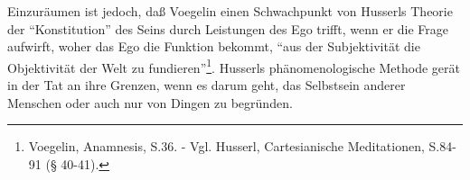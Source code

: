 Einzuräumen ist jedoch, daß Voegelin einen Schwachpunkt von Husserls Theorie
der "`Konstitution"' des Seins durch Leistungen des Ego trifft, wenn er die
Frage aufwirft, woher das Ego die Funktion bekommt, "`aus der Subjektivität
die Objektivität der Welt zu fundieren"'\footnote{Voegelin, Anamnesis, S.36. -
  Vgl. Husserl, Cartesianische Meditationen, S.84-91 (§ 40-41).}. Husserls
phänomenologische Methode gerät in der Tat an ihre Grenzen, wenn es darum geht,
das Selbstsein anderer Menschen oder auch nur von Dingen zu begründen.












